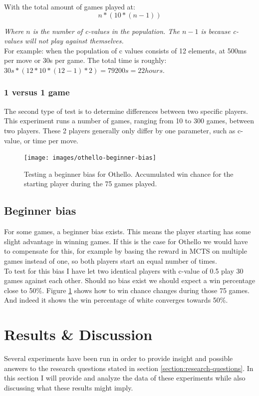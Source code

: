\documentclass[
11pt, %
english, %
singlespacing, %
headsepline, %
]{MastersDoctoralThesis} %
\begin{document}
With the total amount of games played at: 
\[
   n * (10 * (n-1))
\]

\textit{Where $n$ is the number of c-values in the population. The $n-1$ is because c-values will not play against themselves.}\\

For example: when the population of c values consists of 12 elements, at 500ms per move or 30s per game. The total time is roughly: $30s * (12 * 10 * (12-1) * 2) =  79200s = 22 hours$.

\subsection{1 versus 1 game}
The second type of test is to determine differences between two specific players. This experiment runs a number of games, ranging from 10 to 300 games, between two players. These 2 players generally only differ by one parameter, such as c-value, or time per move.

\begin{figure}
	\centering
	\texttt{[image: images/othello-beginner-bias]}
	\caption{Testing a beginner bias for Othello. Accumulated win chance for the starting player during the 75 games played.}
	\label{fig:othello-beginner-bias}
\end{figure}
\section{Beginner bias}
For some games, a beginner bias exists. This means the player starting has some slight advantage in winning games. If this is the case for Othello we would have to compensate for this, for example by basing the reward in MCTS on multiple games instead of one, so both players start an equal number of times.\\

To test for this bias I have let two identical players with c-value of 0.5 play 30 games against each other. Should no bias exist we should expect a win percentage close to 50\%. Figure \ref{fig:othello-beginner-bias} shows how to win chance changes during those 75 games. And indeed it shows the win percentage of white converges towards 50\%.


\chapter{Results \& Discussion}

Several experiments have been run in order to provide insight and possible answers to the research questions stated in section \ref{section:research-questions}. In this section I will provide and analyze the data of these experiments while also discussing what these results might imply.
\end{document}
